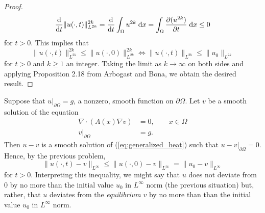 \documentclass{homework}
\begin{document}
\begin{enumerate}[label=\textbf{(\roman*)}]
\begin{proof}
			\begin{equation}
				\frac{\text{d} }{\text{d} t}\lVert u(\cdot,t)\rVert_{L^{2k}}^{2k} = \frac{\text{d} }{\text{d} t} \int_\Omega u^{2k}\;\text{d} x = \int_\Omega \frac{\partial (u^{2k})}{\partial t}\;\text{d} x \le 0
			\end{equation}
			for $t > 0$. This implies that
			\begin{equation}
				\lVert u(\cdot, t) \rVert_{L^{2k}}^{2k} \le \lVert u(\cdot, 0)\rVert_{L^{2k}}^{2k} \iff \lVert u(\cdot, t)\rVert_{L^{2k}} \le \lVert u_0\rVert_{L^{2k}}
			\end{equation}
			for $t > 0$ and $k \ge 1$ an integer. Taking the limit as $k \to \infty$ on both sides and applying Proposition 2.18 from Arbogast and Bona, we obtain the desired result.
		\end{proof}
			
		\questionpart Suppose that $u \big\vert_{\partial\Omega} = g$, a nonzero, smooth function on $\partial\Omega$. Let $v$ be a smooth solution of the equation
		\begin{equation}
			\label{eq:generalized_laplace}
			\begin{aligned}
				\nabla\cdot(A(x)\nabla v) &= 0, \qquad x\in \Omega \\
				v \big\vert_{\partial\Omega} &= g.
			\end{aligned}
		\end{equation}
		Then $u-v$ is a smooth solution of (\ref{eq:generalized_heat}) such that $u-v\big\vert_{\partial\Omega} = 0$. Hence, by the previous problem,
		\begin{equation}
			\lVert u(\cdot,t)-v\rVert_{L^\infty} \le \lVert u(\cdot, 0) - v\rVert_{L^\infty} = \lVert u_0 - v\rVert_{L^\infty}
		\end{equation}
		for $t > 0$. Interpreting this inequality, we might say that $u$ does not deviate from $0$ by no more than the initial value $u_0$ in $L^\infty$ norm (the previous situation) but, rather, that $u$ deviates from the \textit{equilibrium} $v$ by no more than than the initial value $u_0$ in $L^\infty$ norm.
	\end{enumerate}
\end{document}
